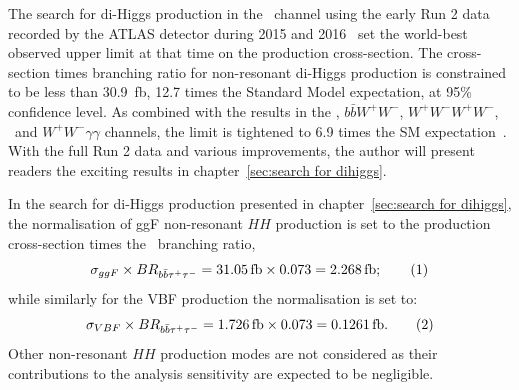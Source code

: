 The search for di-Higgs production in the \bbtautau\ channel
using the early Run 2 data recorded by the ATLAS detector during 2015 and 2016~\cite{HIGG-2016-16}
set the world-best observed upper limit at that time 
on the production cross-section.
The cross-section times branching ratio for non-resonant
di-Higgs production is constrained to be less than 30.9~fb, 12.7 times the Standard
Model expectation, at 95\% confidence level.
As combined with the results in the \bbbb, $b\bar{b}W^+W^-$, $W^+W^-W^+W^-$, \bbyy\ and $W^+W^-\gamma\gamma$
channels, 
the limit is tightened to 6.9 times the SM expectation~\cite{HDBS-2018-58}.
With the full Run 2 data and various improvements, the author will present readers
the exciting results in chapter~\ref{sec:search for dihiggs}.


In the search for di-Higgs production presented in chapter~\ref{sec:search for dihiggs},
the normalisation of ggF non-resonant $HH$ production is set to the production cross-section 
times the \bbtautau\ branching ratio, 
\[\sigma_{ggF} \times BR_{\bbtautau}  = \SI{31.05}{fb} \times 0.073  =  \SI{2.268}{fb};\addtag \]  
while similarly for the VBF production the normalisation is set to:
\[\sigma_{VBF} \times BR_{\bbtautau}  = \SI{1.726}{fb} \times 0.073  =  \SI{0.1261}{fb}.\addtag \]
Other non-resonant $HH$ production modes are not considered as their contributions
to the analysis sensitivity are expected to be negligible.


